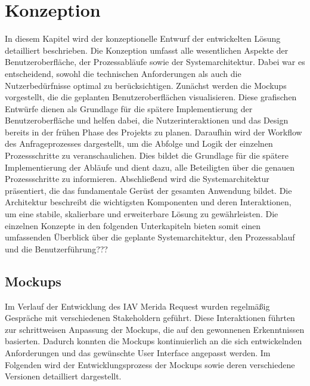 \chapter{Konzeption}
In diesem Kapitel wird der konzeptionelle Entwurf der entwickelten Lösung detailliert beschrieben. Die Konzeption umfasst alle wesentlichen Aspekte der Benutzeroberfläche, der Prozessabläufe sowie der Systemarchitektur. Dabei war es entscheidend, sowohl die technischen Anforderungen als auch die Nutzerbedürfnisse optimal zu berücksichtigen.
\newline
Zunächst werden die Mockups vorgestellt, die die geplanten Benutzeroberflächen visualisieren. Diese grafischen Entwürfe dienen als Grundlage für die spätere Implementierung der Benutzeroberfläche und helfen dabei, die Nutzerinteraktionen und das Design bereits in der frühen Phase des Projekts zu planen.
\newline
Daraufhin wird der Workflow des Anfrageprozesses dargestellt, um die Abfolge und Logik der einzelnen Prozessschritte zu veranschaulichen. Dies bildet die Grundlage für die spätere Implementierung der Abläufe und dient dazu, alle Beteiligten über die genauen Prozessschritte zu informieren.
\newline
Abschließend wird die Systemarchitektur präsentiert, die das fundamentale Gerüst der gesamten Anwendung bildet. Die Architektur beschreibt die wichtigsten Komponenten und deren Interaktionen, um eine stabile, skalierbare und erweiterbare Lösung zu gewährleisten.
\newline
Die einzelnen Konzepte in den folgenden Unterkapiteln bieten somit einen umfassenden Überblick über die geplante Systemarchitektur, den Prozessablauf und die Benutzerführung???
\newpage
\section{Mockups}
Im Verlauf der Entwicklung des IAV Merida Request wurden regelmäßig Gespräche mit verschiedenen Stakeholdern geführt. Diese Interaktionen führten zur schrittweisen Anpassung der Mockups, die auf den gewonnenen Erkenntnissen basierten. Dadurch konnten die Mockups kontinuierlich an die sich entwickelnden Anforderungen und das gewünschte User Interface angepasst werden. Im Folgenden wird der Entwicklungsprozess der Mockups sowie deren verschiedene Versionen detailliert dargestellt.

